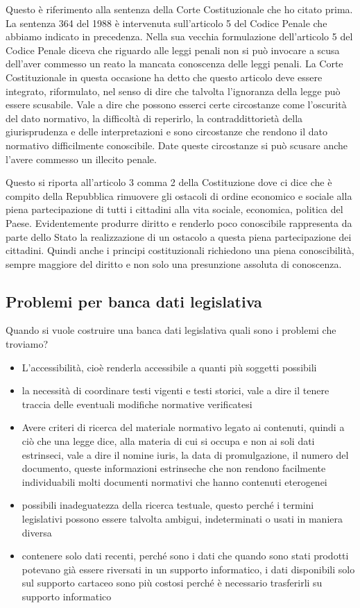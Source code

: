 Questo è riferimento alla sentenza della Corte Costituzionale che ho citato prima. La sentenza 364 del 1988 è intervenuta sull'articolo 5 del Codice Penale che abbiamo indicato in precedenza. Nella sua vecchia formulazione dell'articolo 5 del Codice Penale diceva che riguardo alle leggi penali non si può invocare a scusa dell'aver commesso un reato la mancata conoscenza delle leggi penali. La Corte Costituzionale in questa occasione ha detto che questo articolo deve essere integrato, riformulato, nel senso di dire che talvolta l'ignoranza della legge può essere scusabile. Vale a dire che possono esserci certe circostanze come l'oscurità del dato normativo, la difficoltà di reperirlo, la contraddittorietà della giurisprudenza e delle interpretazioni e sono circostanze che rendono il dato normativo difficilmente conoscibile. Date queste circostanze si può scusare anche l'avere commesso un illecito penale.

Questo si riporta all'articolo 3 comma 2 della Costituzione dove ci dice che è compito della Repubblica rimuovere gli ostacoli di ordine economico e sociale alla piena partecipazione di tutti i cittadini alla vita sociale, economica, politica del Paese. Evidentemente produrre diritto e renderlo poco conoscibile rappresenta da parte dello Stato la realizzazione di un ostacolo a questa piena partecipazione dei cittadini. Quindi anche i principi costituzionali richiedono una piena conoscibilità, sempre maggiore del diritto e non solo una presunzione assoluta di conoscenza.
\subsection{Problemi per banca dati legislativa}
Quando si vuole costruire una banca dati legislativa quali sono i problemi che troviamo? 
\begin{itemize}
    \item L'accessibilità, cioè renderla accessibile a quanti più soggetti possibili
    \item  la necessità di coordinare testi vigenti e testi storici, vale a dire il tenere traccia delle eventuali modifiche normative verificatesi
    \item Avere criteri di ricerca del materiale normativo legato ai contenuti, quindi a ciò che una legge dice, alla materia di cui si occupa e non ai soli dati estrinseci, vale a dire il nomine iuris, la data di promulgazione, il numero del documento, queste informazioni estrinseche che non rendono facilmente individuabili molti documenti normativi che hanno contenuti eterogenei
    \item  possibili inadeguatezza della ricerca testuale, questo perché i termini legislativi possono essere talvolta ambigui, indeterminati o usati in maniera diversa
    \item contenere solo dati recenti, perché sono i dati che quando sono stati prodotti potevano già essere riversati in un supporto informatico, i dati disponibili solo sul supporto cartaceo sono più costosi perché è necessario trasferirli su supporto informatico
\end{itemize}

